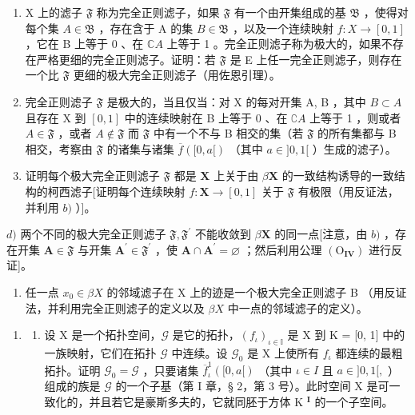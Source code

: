 \begin{enumerate}
\def\labelenumi{\alph{enumi})}
\item
  X 上的滤子 \(\mathfrak{F}\) 称为完全正则滤子，如果 \(\mathfrak{F}\) 有一个由开集组成的基 \(\mathfrak{B}\) ，使得对每个集 \(A \in \mathfrak{B}\) ，存在含于 A 的集 \(B \in \mathfrak{B}\) ，以及一个连续映射 \(f: X \to [0, 1]\) ，它在 B 上等于 0 、在 \(\mathbb{C}A\) 上等于 1 。完全正则滤子称为极大的，如果不存在严格更细的完全正则滤子。证明：若 \(\mathfrak{F}\) 是 E 上任一完全正则滤子，则存在一个比 \(\mathfrak{F}\) 更细的极大完全正则滤子（用佐恩引理）。
\item
  完全正则滤子 \(\mathfrak{F}\) 是极大的，当且仅当：对 X 的每对开集 A, B ，其中 \(B \subset A\) 且存在 X 到 \([0, 1]\) 中的连续映射在 B 上等于 0 、在 \(\complement A\) 上等于 1 ，则或者 \(A \in \mathfrak{F}\) ，或者 \(A \notin \mathfrak{F}\) 而 \(\mathfrak{F}\) 中有一个不与 B 相交的集（若 \(\mathfrak{F}\) 的所有集都与 B 相交，考察由 \(\mathfrak{F}\) 的诸集与诸集 \(\overline{f}([0, a[)\) （其中 \(a \in ]0, 1[\) ）生成的滤子）。
\item
  证明每个极大完全正则滤子 \(\mathfrak{F}\) 都是 \(\mathbf{X}\) 上关于由 \(\beta\mathbf{X}\) 的一致结构诱导的一致结构的柯西滤子{[}证明每个连续映射 \(f: \mathbf{X} \to [\mathrm{0}, \mathrm{1}]\) 关于 \(\mathfrak{F}\) 有极限（用反证法，并利用 \(b)\) ）{]}。
\end{enumerate}

\(d)\) 两个不同的极大完全正则滤子 \(\mathfrak{F},\mathfrak{F}^{\prime}\) 不能收敛到 \(\beta\mathbf{X}\) 的同一点{[}注意，由 \(b)\) ，存在开集 \(\mathbf{A}\in\mathfrak{F}\) 与开集 \(\mathbf{A}^{\prime}\in\mathfrak{F}^{\prime}\) ，使 \(\mathbf{A}\cap\mathbf{A}^{\prime}=\varnothing\) ；然后利用公理 \((\mathrm{O}_{\mathbf{IV}})\) 进行反证{]}。

\begin{enumerate}
\def\labelenumi{\alph{enumi})}
\setcounter{enumi}{4}
\tightlist
\item
  任一点 \(x_{0} \in \beta X\) 的邻域滤子在 X 上的迹是一个极大完全正则滤子 B （用反证法，并利用完全正则滤子的定义以及 \(\beta X\) 中一点的邻域滤子的定义）。
\end{enumerate}

\begin{enumerate}
\def\labelenumi{\arabic{enumi})}
\setcounter{enumi}{8}
\tightlist
\item
  \begin{enumerate}
  \def\labelenumii{\alph{enumii})}
  \tightlist
  \item
    设 X 是一个拓扑空间，\(\mathcal{G}\) 是它的拓扑，\((f_{\iota})_{\iota \in \mathbb{I}}\) 是 X 到 K = {[}0, 1{]} 中的一族映射，它们在拓扑 \(\mathcal{G}\) 中连续。设 \(\mathcal{G}_0\) 是 X 上使所有 \(f_{\iota}\) 都连续的最粗拓扑。证明 \(\mathcal{G}_0 = \mathcal{G}\) ，只要诸集 \(\overline{f}_{\iota}^{1}([0, a[)\) （其中 \(\iota \in I\) 且 \(a \in ]0, 1[,\) ）组成的族是 \(\mathcal{G}\) 的一个子基（第 I 章，§ 2，第 3 号）。此时空间 X 是可一致化的，并且若它是豪斯多夫的，它就同胚于方体 K \(^{\mathbf{I}}\) 的一个子空间。
  \end{enumerate}
\end{enumerate}

